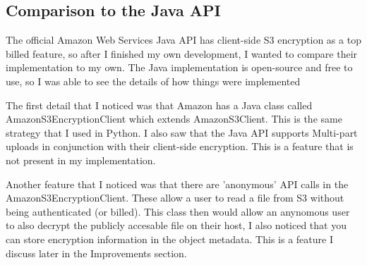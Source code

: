 \subsection{Comparison to the Java API}
The official Amazon Web Services Java API has client-side S3 encryption as a top billed feature, so after I finished my own development,
I wanted to compare their implementation to my own. The Java implementation is open-source and free to use, so I was able to see the details of how things were implemented

The first detail that I noticed  was that Amazon has a Java class called AmazonS3EncryptionClient which extends AmazonS3Client. This is the same strategy that I used in Python. I also saw that the Java API supports Multi-part uploads in conjunction with their client-side encryption. This is a feature that is not present in my implementation.

Another feature that I noticed was that there are 'anonymous' API calls in the AmazonS3EncryptionClient. 
These allow a user to read a file from S3 without being authenticated (or billed). 
This class then would allow an anynomous user to also decrypt the publicly accesable file on their host, 
I also noticed that you can store encryption information in the object metadata. This is a feature I discuss later in the Improvements section.

